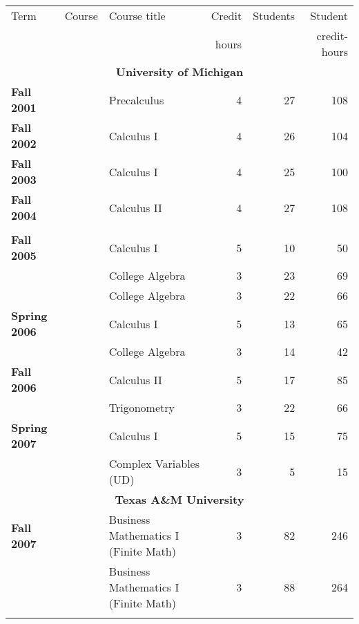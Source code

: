 \documentclass[12pt]{article}
\begin{document}
\begin{center}\footnotesize
\begin{longtable}{@{} l l l rrr @{}}
\toprule
Term & Course & Course title & Credit & Students & Student \\
     &        &              & hours  &          & credit-hours \\
\midrule
\endhead

\multicolumn{6}{c}{\textbf{University of Michigan}} \\
\addlinespace[0.1in]
\textbf{Fall 2001} & & Precalculus & 4 & 27 & 108 \\
\addlinespace[0.1in]
\textbf{Fall 2002} & & Calculus I & 4 & 26 & 104 \\
\addlinespace[0.1in]
\textbf{Fall 2003} & & Calculus I & 4 & 25 & 100 \\
\addlinespace[0.1in]
\textbf{Fall 2004} & & Calculus II & 4 & 27 & 108 \\
\addlinespace[0.1in]

\midrule

\multicolumn{6}{c}{\textbf{Southeastern Louisiana University}} \\
\addlinespace[0.1in]

\textbf{Fall 2005} & & Calculus I & 5 & 10 & 50 \\
 & & College Algebra & 3 & 23 & 69 \\
 & & College Algebra & 3 & 22 & 66 \\
\addlinespace[0.1in]

\textbf{Spring 2006} & & Calculus I & 5 & 13 & 65 \\
 & & College Algebra & 3 & 14 & 42 \\
\addlinespace[0.1in]


\textbf{Fall 2006} & & Calculus II & 5 & 17 & 85 \\
 & & Trigonometry & 3 & 22 & 66 \\
\addlinespace[0.1in]

\textbf{Spring 2007} & & Calculus I & 5 & 15 & 75 \\
 & & Complex Variables (UD) & 3 & 5 & 15 \\

\midrule

\multicolumn{6}{c}{\textbf{Texas A\&M University}} \\
\addlinespace[0.1in]

\textbf{Fall 2007} & & Business Mathematics I (Finite Math) & 3 & 82 & 246\\
 & & Business Mathematics I (Finite Math) & 3 & 88 & 264 \\
\addlinespace[0.1in]


\end{longtable}
\end{center}
\end{document}
